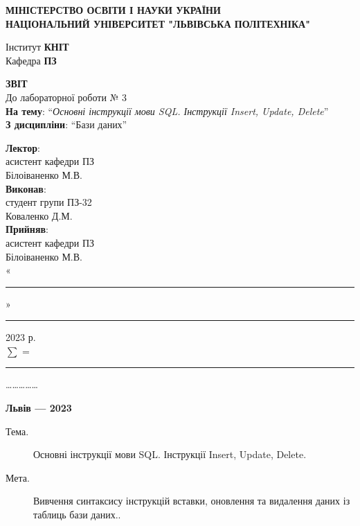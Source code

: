\documentclass[14pt]{extreport}
\newcommand\subject{Бази даних}
\newcommand\lecturer{асистент кафедри ПЗ\\Білоіваненко М.В.}
\newcommand\teacher{асистент кафедри ПЗ\\Білоіваненко М.В.}
\newcommand\mygroup{ПЗ-32}
\newcommand\lab{3}
\newcommand\theme{Основні інструкції мови SQL. Інструкції Insert, Update, Delete}
\newcommand\purpose{Вивчення синтаксису інструкцій вставки, оновлення та видалення даних із
	таблиць бази даних.}
\begin{document}
\begin{normalsize}
	\begin{titlepage}
		\thispagestyle{empty}
		\begin{center}
			\textbf{МІНІСТЕРСТВО ОСВІТИ І НАУКИ УКРАЇНИ\\
				НАЦІОНАЛЬНИЙ УНІВЕРСИТЕТ "ЛЬВІВСЬКА ПОЛІТЕХНІКА"}
		\end{center}
		\begin{flushright}
			Інститут \textbf{КНІТ}\\
			Кафедра \textbf{ПЗ}
		\end{flushright}
		\vspace{200pt}
		\begin{center}
			\textbf{ЗВІТ}\\
			\vspace{10pt}
			До лабораторної роботи № \lab\\
			\textbf{На тему}: “\textit{\theme}”\\
			\textbf{З дисципліни}: “\subject”
		\end{center}
		\vspace{40pt}
		\begin{flushright}
			
			\textbf{Лектор}:\\
			\lecturer\\
			\vspace{10pt}
			\textbf{Виконав}:\\
			
			студент групи \mygroup\\
			Коваленко Д.М.\\
			\vspace{10pt}
			\textbf{Прийняв}:\\
			
			\teacher\\
			
			\vspace{28pt}
			«\rule{1cm}{0.15mm}» \rule{1.5cm}{0.15mm} 2023 р.\\
			$\sum$ = \rule{1cm}{0.15mm}……………\\
			
		\end{flushright}
		\vspace{\fill}
		\begin{center}
			\textbf{Львів — 2023}
		\end{center}
	\end{titlepage}
		
	\begin{description}
		\item[Тема.] \theme.
		\item[Мета.] \purpose.
	\end{description}


\end{normalsize}
\end{document}
